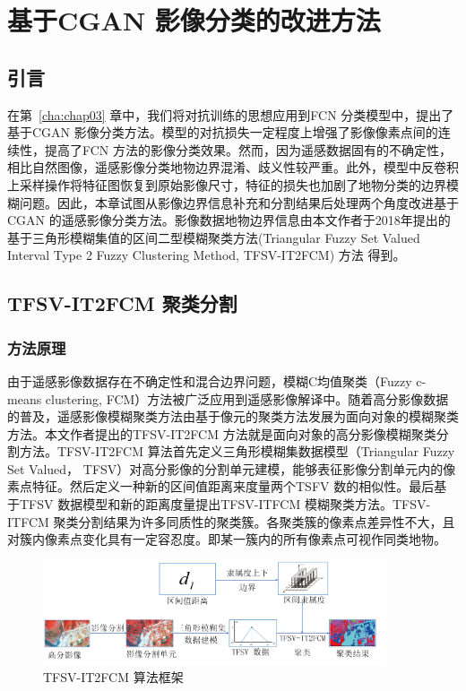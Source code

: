 
\chapter{基于CGAN 影像分类的改进方法}
\label{cha:chap04}

\section{引言}
\label{sec:chap04-1}
在第~\ref{cha:chap03} 章中，我们将对抗训练的思想应用到FCN 分类模型中，提出了基于CGAN 影像分类方法。模型的对抗损失一定程度上增强了影像像素点间的连续性，提高了FCN 方法的影像分类效果。然而，因为遥感数据固有的不确定性，相比自然图像，遥感影像分类地物边界混淆、歧义性较严重。此外，模型中反卷积上采样操作将特征图恢复到原始影像尺寸，特征的损失也加剧了地物分类的边界模糊问题。因此，本章试图从影像边界信息补充和分割结果后处理两个角度改进基于CGAN 的遥感影像分类方法。影像数据地物边界信息由本文作者于2018年提出的基于三角形模糊集值的区间二型模糊聚类方法(Triangular Fuzzy Set Valued Interval Type 2 Fuzzy Clustering Method, TFSV-IT2FCM) 方法\cite{jiang2018enhanced} 得到。


\section{TFSV-IT2FCM 聚类分割}
\label{sec:chap04-2}

\subsection{方法原理}
\label{subsec:chap04-2-1}
由于遥感影像数据存在不确定性和混合边界问题，模糊C均值聚类（Fuzzy c-means clustering, FCM）方法被广泛应用到遥感影像解译中\cite{bezdek1984fcm}。随着高分影像数据的普及，遥感影像模糊聚类方法由基于像元的聚类方法发展为面向对象的模糊聚类方法。本文作者提出的TFSV-IT2FCM 方法就是面向对象的高分影像模糊聚类分割方法。TFSV-IT2FCM 算法首先定义三角形模糊集数据模型（Triangular Fuzzy Set Valued， TFSV）对高分影像的分割单元建模，能够表征影像分割单元内的像素点特征。然后定义一种新的区间值距离来度量两个TSFV 数的相似性。最后基于TFSV 数据模型和新的距离度量提出TFSV-ITFCM 模糊聚类方法。TFSV-ITFCM 聚类分割结果为许多同质性的聚类簇。各聚类簇的像素点差异性不大，且对簇内像素点变化具有一定容忍度。即某一簇内的所有像素点可视作同类地物。

\begin{figure}[!h]
    \centering
    \includegraphics[width=0.9\textwidth]{figures/tfsvit2fcm}
    \caption{TFSV-IT2FCM 算法框架}
    \label{fig:tfsvit2fcm}
\end{figure}

